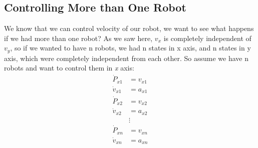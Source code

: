 \documentclass[10pt,letterpaper]{article}
\begin{document}
\subsection{Controlling More than One Robot}
We know that we can control velocity of our robot, we want to see what happens if we had more than one robot? As we saw here, $v_x$ is completely independent of $v_y$, so if we wanted to have n robots, we had n states in x axis, and n states in y axis, which were completely independent from each other. So assume we have n robots and want to control them in \emph{x} axis:\\
\begin{align}
\dot{P}_{x1} &= v_{x1}\\\nonumber
\dot{v}_{x1} &= a_{x1}\\\nonumber
\dot{P}_{x2} &= v_{x2}\\\nonumber
\dot{v}_{x2} &= a_{x2}\\\nonumber
&\vdots\\\nonumber
\dot{P}_{xn} &= v_{xn}\\\nonumber
\dot{v}_{xn} &= a_{xn}\nonumber
\end{align}
\end{document}
